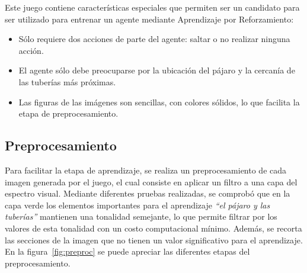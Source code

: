 \documentclass[journal]{IEEEtran}
\begin{document}
    Este juego contiene características especiales que permiten ser un candidato para ser utilizado para entrenar un agente mediante Aprendizaje por Reforzamiento: 
    \begin{itemize}
        \item Sólo requiere dos acciones de parte del agente: saltar o no realizar ninguna acción.
        \item El agente sólo debe preocuparse por la ubicación del pájaro y la cercanía de las tuberías más próximas. 
        \item Las figuras de las imágenes son sencillas, con colores sólidos, lo que facilita la etapa de preprocesamiento.
    \end{itemize}

\subsection{Preprocesamiento}
    Para facilitar la etapa de aprendizaje, se realiza un preprocesamiento de cada imagen generada por el juego, el cual consiste en aplicar un filtro a una capa del espectro visual. Mediante diferentes pruebas realizadas, se comprobó que en la capa verde los elementos importantes para el aprendizaje \emph{``el pájaro y las tuberías''} mantienen una tonalidad semejante, lo que permite filtrar por los valores de esta tonalidad con un costo computacional mínimo. Además, se recorta las secciones de la imagen que no tienen un valor significativo para el aprendizaje. En la figura~\ref{fig:preproc} se puede apreciar las diferentes etapas del preprocesamiento.
\end{document}
